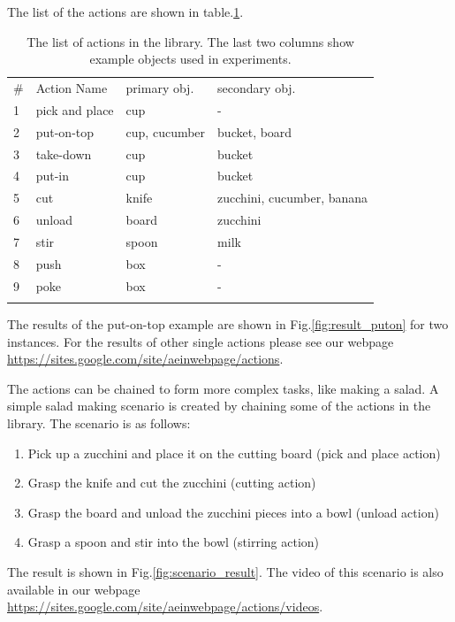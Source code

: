 The list of the actions are shown in table.\ref{tab:action_list}.
\begin{table}
\caption{The list of actions in the library. The last two columns show example objects used in experiments.}
\label{tab:action_list}       %
\begin{tabular}{llll}
\hline\noalign{\smallskip}
\# & Action Name & primary obj. & secondary obj. \\
\noalign{\smallskip}\hline\noalign{\smallskip}
1 & pick and place  & cup & - \\
2 & put-on-top & cup, cucumber & bucket, board \\ 
3 & take-down  & cup & bucket \\
4 & put-in  & cup & bucket \\
5 & cut  & knife & zucchini, cucumber, banana \\
6 & unload  & board & zucchini \\
7 & stir  & spoon & milk \\
8 & push  & box & - \\
9 & poke  & box & -\\
\noalign{\smallskip}\hline
\end{tabular}
\end{table}

The results of the put-on-top example are shown in Fig.\ref{fig:result_puton} for two instances.
For the results of other single actions please see our webpage \url{https://sites.google.com/site/aeinwebpage/actions}.

The actions can be chained to form more complex tasks, like making a salad.
A simple salad making scenario is created by chaining some of the actions in the library.
The scenario is as follows:
\begin{enumerate}
 \item Pick up a zucchini and place it on the cutting board (pick and place action)
 \item Grasp the knife and cut the zucchini (cutting action)
 \item Grasp the board and unload the zucchini pieces into a bowl (unload action)
 \item Grasp a spoon and stir into the bowl (stirring action)
\end{enumerate}

The result is shown in Fig.\ref{fig:scenario_result}.
The video of this scenario is also available in our webpage \url{https://sites.google.com/site/aeinwebpage/actions/videos}.

